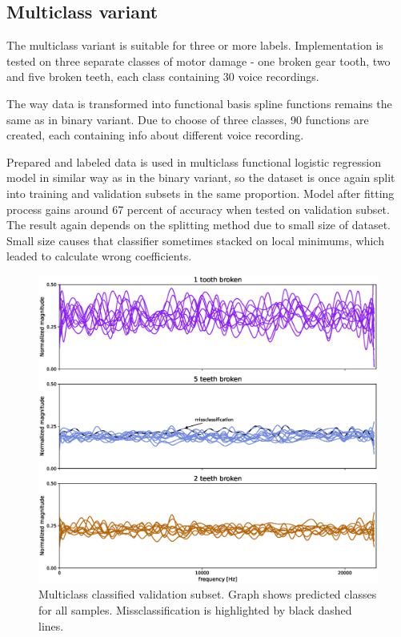 \documentclass[energies,article,submit,pdftex,moreauthors]{Definitions/mdpi}
\begin{document}
\subsection{Multiclass variant}

The multiclass variant is suitable for three or more labels. Implementation is tested on three separate classes of motor damage - one broken gear tooth, two and five broken teeth, each class containing 30 voice recordings.

The way data is transformed into functional basis spline functions remains the same as in binary variant. Due to choose of three classes, 90 functions are created, each containing info about different voice recording. 

Prepared and labeled data is used in multiclass functional logistic regression model in similar way as in the binary variant, so the dataset is once again split into training and validation subsets in the same proportion. Model after fitting process gains around 67 percent of accuracy when tested on validation subset. The result again depends on the splitting method due to small size of dataset. Small size causes that classifier sometimes stacked on local minimums, which leaded to calculate wrong coefficients. 

\begin{figure}[H]
\centering
\includegraphics[width=\textwidth]{images/multiclass_classification}
\caption{Multiclass classified validation subset. Graph shows predicted classes for all samples. Missclassification is highlighted by black dashed lines.}
\label{fig:multiclass}
\end{figure}
\unskip
\vspace{5mm}
\end{document}
